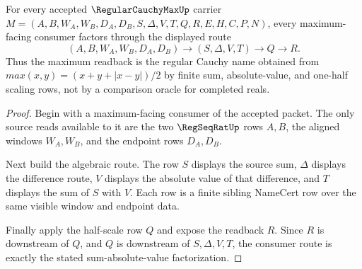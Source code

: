 \begin{theorem}
\label{thm:regular-cauchy-max-sum-abs-factorization}
For every accepted $\RegularCauchyMaxUp$ carrier $M=(A,B,W_A,W_B,D_A,D_B,S,\Delta,V,T,Q,R,E,H,C,P,N)$, every maximum-facing consumer factors through the displayed route
$$
(A,B,W_A,W_B,D_A,D_B)
\longrightarrow
(S,\Delta,V,T)
\longrightarrow
Q
\longrightarrow
R .
$$
Thus the maximum readback is the regular Cauchy name obtained from $max(x,y)=(x+y+|x-y|)/2$ by finite sum, absolute-value, and one-half scaling rows, not by a comparison oracle for completed reals.
\end{theorem}
\begin{proof}
Begin with a maximum-facing consumer of the accepted packet. The only source reads available to it are the two $\RegSeqRatUp$ rows $A,B$, the aligned windows $W_A,W_B$, and the endpoint rows $D_A,D_B$.

Next build the algebraic route. The row $S$ displays the source sum, $\Delta$ displays the difference route, $V$ displays the absolute value of that difference, and $T$ displays the sum of $S$ with $V$. Each row is a finite sibling NameCert row over the same visible window and endpoint data.

Finally apply the half-scale row $Q$ and expose the readback $R$. Since $R$ is downstream of $Q$, and $Q$ is downstream of $S,\Delta,V,T$, the consumer route is exactly the stated sum-absolute-value factorization.
\end{proof}

